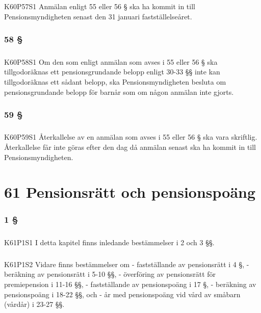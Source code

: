\documentclass[a4paper,notitlepage,openany,10pt]{book}
\begin{document}
\paragraph*{}
{\tiny K60P57S1}
Anmälan enligt 55 eller 56 § ska ha kommit in till Pensionsmyndigheten senast den 31 januari fastställelseåret.
\subsection*{58 §}
\paragraph*{}
{\tiny K60P58S1}
Om den som enligt anmälan som avses i 55 eller 56 § ska tillgodoräknas ett pensionsgrundande belopp enligt 30-33 §§ inte kan tillgodoräknas ett sådant belopp, ska Pensionsmyndigheten besluta om pensionsgrundande belopp för barnår som om någon anmälan inte gjorts.
\subsection*{59 §}
\paragraph*{}
{\tiny K60P59S1}
Återkallelse av en anmälan som avses i 55 eller 56 § ska vara skriftlig. Återkallelse får inte göras efter den dag då anmälan senast ska ha kommit in till Pensionsmyndigheten.
\chapter*{61 Pensionsrätt och pensionspoäng}
\subsection*{1 §}
\paragraph*{}
{\tiny K61P1S1}
I detta kapitel finns inledande bestämmelser i 2 och 3 §§.
\paragraph*{}
{\tiny K61P1S2}
Vidare finns bestämmelser om
\newline - fastställande av pensionsrätt i 4 §,
\newline - beräkning av pensionsrätt i 5-10 §§,
\newline - överföring av pensionsrätt för premiepension i 11-16 §§,
\newline - fastställande av pensionspoäng i 17 §,
\newline - beräkning av pensionspoäng i 18-22 §§, och
\newline - år med pensionspoäng vid vård av småbarn (vårdår) i 23-27 §§.
\end{document}
